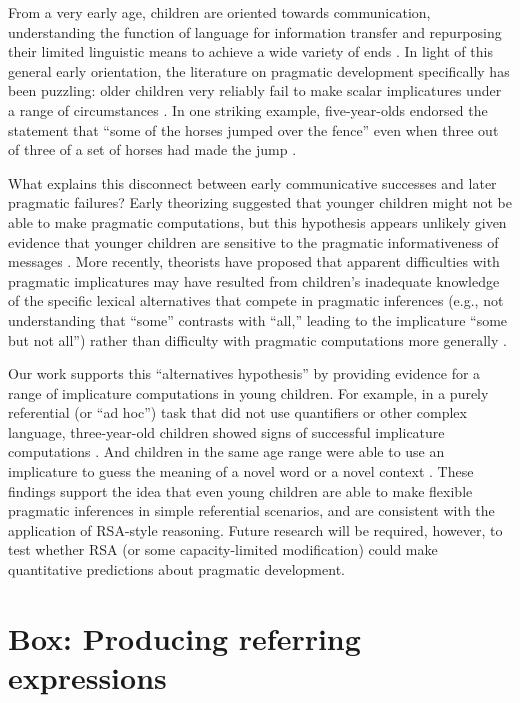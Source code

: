 \documentclass[]{elsarticle}
\begin{document}
From a very early age, children are oriented towards communication, understanding the function of language for information
transfer and repurposing their limited linguistic means to achieve a
wide variety of ends \citep{vouloumanos2012,clark2010}. In light
of this general early orientation, the literature on pragmatic
development specifically has been puzzling: older children very reliably
fail to make scalar implicatures under a range of circumstances \citep{noveck2001}. In one striking example, five-year-olds endorsed the statement that ``some of the horses jumped over the fence'' even when three out of three of a set of horses had made the jump \citep{papafragou2003}.

What explains this disconnect between early communicative successes and
later pragmatic failures? Early theorizing suggested that younger
children might not be able to make pragmatic computations, but this hypothesis appears unlikely given evidence that
younger children are sensitive to the pragmatic informativeness of
messages \citep{katsos2011,oneill2001}. More
recently, theorists have proposed that apparent difficulties with
pragmatic implicatures may have resulted from children's inadequate
knowledge of the specific lexical alternatives that compete in pragmatic
inferences (e.g., not understanding that ``some'' contrasts with
``all,'' leading to the implicature ``some but not all'') rather than
difficulty with pragmatic computations more generally \citep{barner2011}.

Our work supports this ``alternatives hypothesis'' by providing evidence
for a range of implicature computations in young children. For example,
in a purely referential (or ``ad hoc'') task that did not use
quantifiers or other complex language, three-year-old children showed
signs of successful implicature computations \citep{stiller2015}. And children in the same age range were able to use an
implicature to guess the meaning of a novel word \citep{frank2014} or a novel context \citep{horowitz2016}. These findings support the idea that even young children are able
to make flexible pragmatic inferences in simple referential scenarios,
and are consistent with the application of RSA-style reasoning. Future
research will be required, however, to test whether RSA (or some
capacity-limited modification) could make quantitative predictions about
pragmatic development.

\section{Box: Producing referring expressions}\label{box-producing-referring-expressions}
\label{proref}
\end{document}
